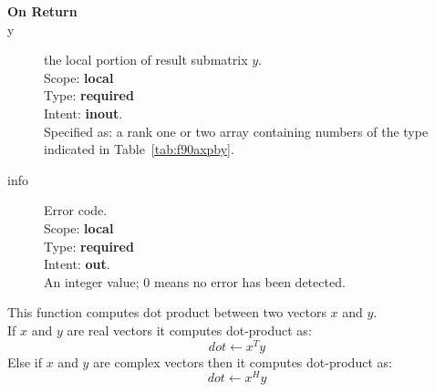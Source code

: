 \begin{description}

\end{description}

\begin{description}
\item[\bf On Return]
\item[y] the local portion of result submatrix $y$.\\
Scope: {\bf local} \\
Type: {\bf required} \\
Intent: {\bf inout}.\\
Specified as: a rank one or two array containing numbers of the type
indicated in Table~\ref{tab:f90axpby}.
\item[info] Error code.\\
Scope: {\bf local} \\
Type: {\bf required} \\
Intent: {\bf out}.\\
An integer value; 0 means no error has been detected. 
\end{description}


%
%


This function computes dot product between two vectors $x$ and
$y$.\\
If $x$ and $y$ are real vectors
it computes dot-product as:
\[dot \leftarrow x^T y\]
Else if $x$ and $y$ are complex vectors then it computes dot-product as:
\[dot \leftarrow x^H y\]


